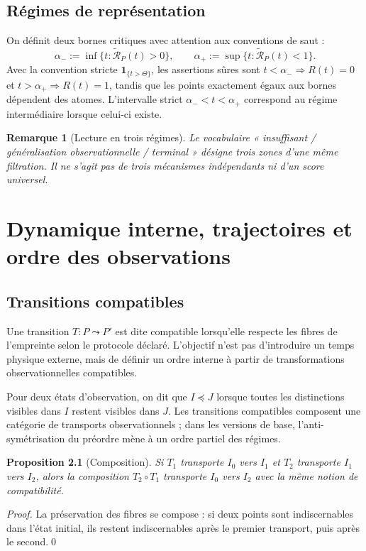 \documentclass[11pt,a4paper,openany]{book}
\newtheorem{proposition}[definition]{Proposition}
\newtheorem{remark}[definition]{Remarque}
\begin{document}
\section{Régimes de représentation}
On définit deux bornes critiques avec attention aux conventions de saut :
\[
\alpha_-:=\inf\{t:\widetilde{\mathcal R}_P(t)>0\},
\qquad
\alpha_+:=\sup\{t:\widetilde{\mathcal R}_P(t)<1\}.
\]
Avec la convention stricte \(\mathbf 1_{\{t>\Theta\}}\), les assertions sûres sont \(t<\alpha_-\Rightarrow R(t)=0\) et \(t>\alpha_+\Rightarrow R(t)=1\), tandis que les points exactement égaux aux bornes dépendent des atomes. L'intervalle strict \(\alpha_-<t<\alpha_+\) correspond au régime intermédiaire lorsque celui-ci existe.

\begin{remark}[Lecture en trois régimes]
Le vocabulaire « insuffisant / généralisation observationnelle / terminal » désigne trois zones d'une même filtration. Il ne s'agit pas de trois mécanismes indépendants ni d'un score universel.
\end{remark}

\chapter{Dynamique interne, trajectoires et ordre des observations}
\section{Transitions compatibles}
Une transition \(T:P\leadsto P'\) est dite compatible lorsqu'elle respecte les fibres de l'empreinte selon le protocole déclaré. L'objectif n'est pas d'introduire un temps physique externe, mais de définir un ordre interne à partir de transformations observationnelles compatibles.

Pour deux états d'observation, on dit que \(I\preceq J\) lorsque toutes les distinctions visibles dans \(I\) restent visibles dans \(J\). Les transitions compatibles composent une catégorie de transports observationnels ; dans les versions de base, l'anti-symétrisation du préordre mène à un ordre partiel des régimes.

\begin{proposition}[Composition]
Si \(T_1\) transporte \(I_0\) vers \(I_1\) et \(T_2\) transporte \(I_1\) vers \(I_2\), alors la composition \(T_2\circ T_1\) transporte \(I_0\) vers \(I_2\) avec la même notion de compatibilité.
\end{proposition}
\begin{proof}
La préservation des fibres se compose : si deux points sont indiscernables dans l'état initial, ils restent indiscernables après le premier transport, puis après le second.\qed\end{proof}
\end{document}
